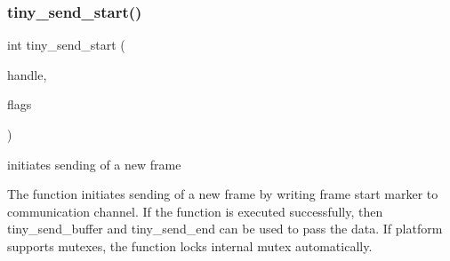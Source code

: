 \subsubsection{\texorpdfstring{tiny\+\_\+send\+\_\+start()}{tiny\_send\_start()}}
{\footnotesize\ttfamily int tiny\+\_\+send\+\_\+start (\begin{DoxyParamCaption}\item[{\hyperlink{structSTinyData}{S\+Tiny\+Data} $\ast$}]{handle,  }\item[{uint8\+\_\+t}]{flags }\end{DoxyParamCaption})}



initiates sending of a new frame 

The function initiates sending of a new frame by writing frame start marker to communication channel. If the function is executed successfully, then tiny\+\_\+send\+\_\+buffer and tiny\+\_\+send\+\_\+end can be used to pass the data. If platform supports mutexes, the function locks internal mutex automatically.


